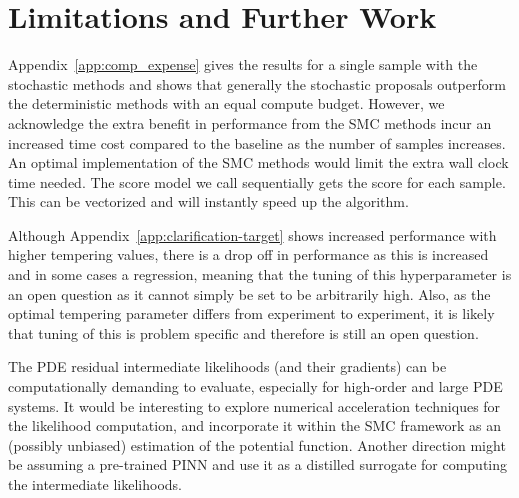 \section{Limitations and Further Work}
Appendix~\ref{app:comp_expense} gives the results for a single sample with the stochastic methods and shows that generally the stochastic proposals outperform the deterministic methods with an equal compute budget. However, we acknowledge the extra benefit in performance from the SMC methods incur an increased time cost compared to the baseline as the number of samples increases. An optimal implementation of the SMC methods would limit the extra wall clock time needed. The score model we call sequentially gets the score for each sample. This can be vectorized and will instantly speed up the algorithm. 

Although Appendix~\ref{app:clarification-target} shows increased performance with higher tempering values, there is a drop off in performance as this is increased and in some cases a regression, meaning that the tuning of this hyperparameter is an open question as it cannot simply be set to be arbitrarily high. Also, as the optimal tempering parameter differs from experiment to experiment, it is likely that tuning of this is problem specific and therefore is still an open question. 

The PDE residual intermediate likelihoods (and their gradients) can be computationally demanding to evaluate, especially for high-order and large PDE systems. It would be interesting to explore numerical acceleration techniques for the likelihood computation, and incorporate it within the SMC framework as an (possibly unbiased) estimation of the potential function. 
Another direction might be assuming a pre-trained PINN and use it as a distilled surrogate for computing the intermediate likelihoods. 
 


